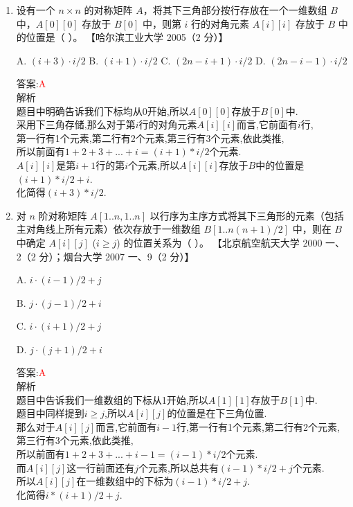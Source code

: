 \documentclass[lang=cn,newtx,10pt,scheme=chinese]{../elegantbook}
\begin{document}
\begin{enumerate}
    \item 设有一个 $n \times n$ 的对称矩阵 $A$，将其下三角部分按行存放在一个一维数组 $B$ 中，$A[0][0]$ 存放于 $B[0]$ 中，则第 $i$ 行的对角元素 $A[i][i]$ 存放于 $B$ 中的位置是（ ）。  
    【哈尔滨工业大学 2005（2 分）】  

    A. $(i+3) \cdot i / 2$ \quad B. $(i+1) \cdot i / 2$ \quad C. $(2n-i+1) \cdot i / 2$ \quad D. $(2n-i-1) \cdot i / 2$  

    答案:\textcolor{red}{A}\\
    解析\\
    题目中明确告诉我们下标均从0开始,所以$A[0][0]$存放于$B[0]$中.\\
    采用下三角存储,那么对于第$i$行的对角元素$A[i][i]$而言,它前面有$i$行,\\
    第一行有1个元素,第二行有2个元素,第三行有3个元素,依此类推,\\
    所以前面有$1+2+3+...+i=(i+1)*i/2$个元素.\\
    $A[i][i]$是第$i+1$行的第$i$个元素,所以$A[i][i]$存放于$B$中的位置是$(i+1)*i/2+i$.\\
    化简得$(i+3)*i/2$.\\

    \item 对 $n$ 阶对称矩阵 $A[1..n,1..n]$ 以行序为主序方式将其下三角形的元素（包括主对角线上所有元素）依次存放于一维数组 $B[1..n(n+1)/2]$ 中，则在 $B$ 中确定 $A[i][j]$ ($i \geq j$) 的位置关系为（ ）。  
    【北京航空航天大学 2000 一、2（2 分）；烟台大学 2007 一、9（2 分）】  

    A. $i \cdot (i-1)/2 + j$  

    B. $j \cdot (j-1)/2 + i$  

    C. $i \cdot (i+1)/2 + j$  

    D. $j \cdot (j+1)/2 + i$  

    答案:\textcolor{red}{A}\\
    解析\\
    题目中告诉我们一维数组的下标从1开始,所以$A[1][1]$存放于$B[1]$中.\\
    题目中同样提到$i \geq j$,所以$A[i][j]$的位置是在下三角位置.\\
    那么对于$A[i][j]$而言,它前面有$i-1$行,第一行有1个元素,第二行有2个元素,第三行有3个元素,依此类推,\\
    所以前面有$1+2+3+...+i-1=(i-1)*i/2$个元素.\\
    而$A[i][j]$这一行前面还有$j$个元素,所以总共有$(i-1)*i/2+j$个元素.\\
    所以$A[i][j]$在一维数组中的下标为$(i-1)*i/2+j$.\\
    化简得$i*(i+1)/2+j$.\\
    

\end{enumerate}
\end{document}
